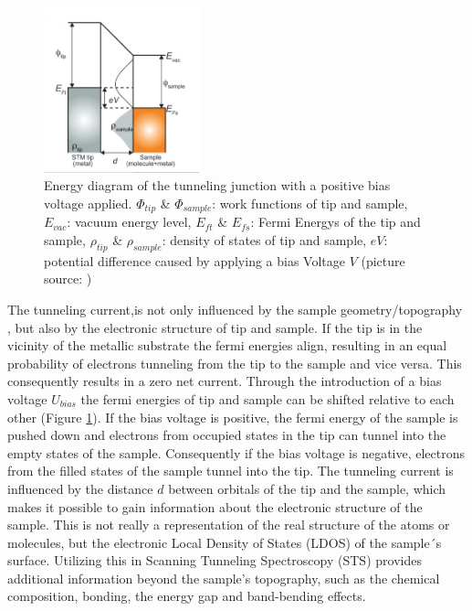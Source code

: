 \newpage
\begin{figure}
    \centering
    \includegraphics[width=0.4\textwidth]{graphics/Tunneling_diagram_japan.PNG}
    \caption{Energy diagram of the tunneling  junction with a positive bias voltage applied. $\Phi_{tip}$ \& $\Phi_{sample}$: work functions of tip and sample, $E_{vac}$: vacuum energy level,  $E_{ft}$ \& $E_{fs}$: Fermi Energys of the tip and sample,  $\rho_{tip}$ \& $\rho_{sample}$: density of states of tip and sample,  $eV$: potential difference caused by applying a bias Voltage $V$ (picture source: \cite{Kano}) }
    \label{fig:energy_diagram}
\end{figure}

The tunneling current,is not only influenced by the sample geometry/topography , but also by the electronic structure of tip and sample.
If the tip is in the vicinity of the metallic substrate the fermi energies align, resulting in an equal probability of electrons tunneling from the tip to the sample and vice versa.
This consequently results in a zero net current. 
Through the introduction of a bias voltage $U_{bias}$ the fermi energies of tip and sample can be shifted relative to each other (Figure \ref{fig:energy_diagram}).
If the bias voltage is positive, the fermi energy of the sample is pushed down and electrons from occupied states in the tip can tunnel into the empty states of the sample.
Consequently if the bias voltage is negative, electrons from the filled states of the sample tunnel into the tip.
The tunneling current is influenced by the distance $d$ between orbitals of the tip and the sample, which makes it possible to gain information about the electronic structure of the sample.
This is not really a representation of the real structure of the atoms or molecules, but the electronic Local Density of States (LDOS) of the sample´s surface.
Utilizing this in Scanning Tunneling Spectroscopy (STS) provides additional information beyond the sample's topography, such as the chemical composition, bonding, the energy gap and band-bending effects. \cite{cbai}
\newpage
